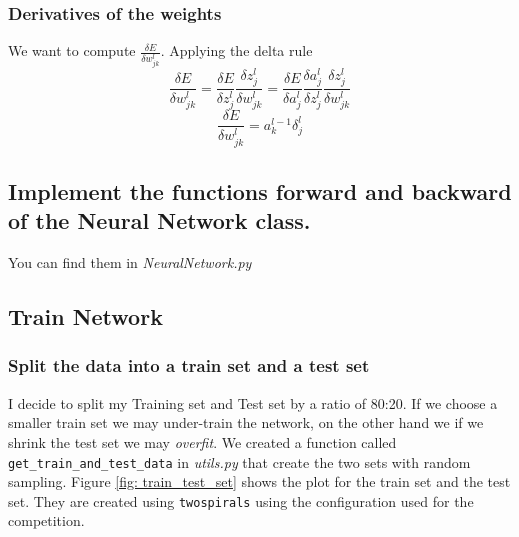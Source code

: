 \documentclass[11pt]{article}
\begin{document}
\subsubsection{Derivatives of the weights}
We want to compute $\frac{\delta E}{\delta w^l_{jk}}$. Applying the delta rule
\begin{equation}
\frac{\delta E}{\delta w^l_{jk}} = \frac{\delta E}{\delta z^l_j}\frac{\delta z^l_j}{\delta w^l_{jk}} =	
\frac{\delta E}{\delta a^l_j}\frac{\delta a^l_j}{\delta z^l_{j}}
\frac{\delta z^l_j}{\delta w^l_{jk}}
\end{equation}
\begin{equation}
\label{eq:derivativesWeigthDeltas}	
\frac{\delta E}{\delta w^l_{jk}} = a^{l-1}_k \delta^l_j
\end{equation}
\subsection{Implement the functions forward and backward of the Neural Network class.}
You can find them in \emph{NeuralNetwork.py}
\subsection{Train Network}
\subsubsection{ Split the data into a train set and a test set}
I decide to split my Training set and Test set by a ratio of 80:20. If we choose a smaller train set we may under-train the network, on the other hand we if we shrink the test set we may \emph{overfit}. We created a function called \texttt{get\_train\_and\_test\_data} in \emph{utils.py} that create the two sets with random sampling.
Figure \ref{fig: train_test_set} shows the plot for the train set and the test set. They are created using \texttt{twospirals} using the configuration used for the competition.
\end{document}
